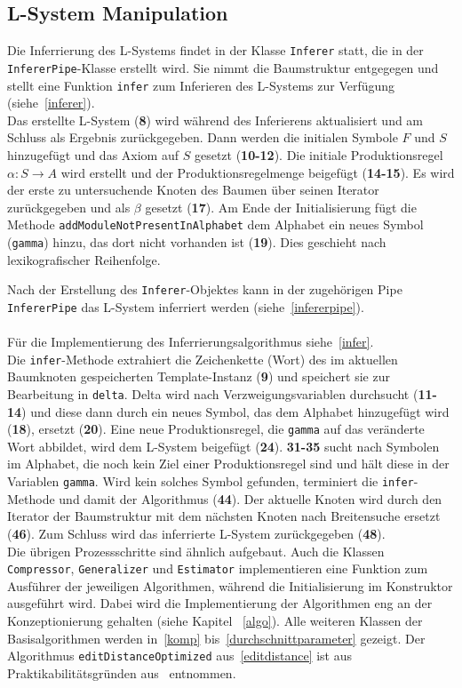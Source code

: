 \subsection*{L-System Manipulation}
Die Inferrierung des L-Systems findet in der Klasse \texttt{Inferer} statt, die in der \texttt{InfererPipe}-Klasse erstellt wird.
Sie nimmt die Baumstruktur entgegegen und stellt eine Funktion \texttt{infer} zum Inferieren des L-Systems zur Verfügung (siehe~\ref{inferer}).\\
Das erstellte L-System (\textbf{8}) wird während des Inferierens aktualisiert und am Schluss als Ergebnis zurückgegeben.
Dann werden die initialen Symbole $F$ und $S$ hinzugefügt und das Axiom auf $S$ gesetzt (\textbf{10-12}).
Die initiale Produktionsregel $\alpha: S \rightarrow A$ wird erstellt und der Produktionsregelmenge beigefügt (\textbf{14-15}).
Es wird der erste zu untersuchende Knoten des Baumen über seinen Iterator zurückgegeben und als $\beta$ gesetzt (\textbf{17}).
Am Ende der Initialisierung fügt die Methode \texttt{addModuleNotPresentInAlphabet} dem Alphabet ein neues Symbol (\texttt{gamma}) hinzu,
das dort nicht vorhanden ist (\textbf{19}).
Dies geschieht nach lexikografischer Reihenfolge.

Nach der Erstellung des \texttt{Inferer}-Objektes kann in der zugehörigen Pipe \texttt{InfererPipe} das L-System inferriert
werden (siehe~\ref{infererpipe}).\\~\\
Für die Implementierung des Inferrierungsalgorithmus siehe~\ref{infer}.\\
Die \texttt{infer}-Methode extrahiert die Zeichenkette (Wort) des im aktuellen Baumknoten gespeicherten Template-Instanz
(\textbf{9}) und speichert sie zur Bearbeitung in \texttt{delta}.
Delta wird nach Verzweigungsvariablen durchsucht (\textbf{11-14}) und diese dann durch ein neues Symbol,
das dem Alphabet hinzugefügt wird (\textbf{18}), ersetzt (\textbf{20}).
Eine neue Produktionsregel, die \texttt{gamma} auf das veränderte Wort abbildet, wird dem L-System beigefügt (\textbf{24}).
\textbf{31-35} sucht nach Symbolen im Alphabet, die noch kein Ziel einer Produktionsregel sind und hält diese in der
Variablen \texttt{gamma}.
Wird kein solches Symbol gefunden, terminiert die \texttt{infer}-Methode und damit der Algorithmus (\textbf{44}).
Der aktuelle Knoten wird durch den Iterator der Baumstruktur mit dem nächsten Knoten nach Breitensuche ersetzt (\textbf{46}).
Zum Schluss wird das inferrierte L-System zurückgegeben (\textbf{48}).\\

Die übrigen Prozessschritte sind ähnlich aufgebaut.
Auch die Klassen \texttt{Compressor}, \texttt{Generalizer} und \texttt{Estimator} implementieren eine Funktion zum Ausführer
der jeweiligen Algorithmen, während die Initialisierung im Konstruktor ausgeführt wird.
Dabei wird die Implementierung der Algorithmen eng an der Konzeptionierung gehalten (siehe Kapitel ~\ref{algo}).
Alle weiteren Klassen der Basisalgorithmen werden in~\ref{komp} bis~\ref{durchschnittparameter} gezeigt.
Der Algorithmus \texttt{editDistanceOptimized} aus~\ref{editdistance} ist aus Praktikabilitätsgründen aus~\cite{editdistance}
entnommen.